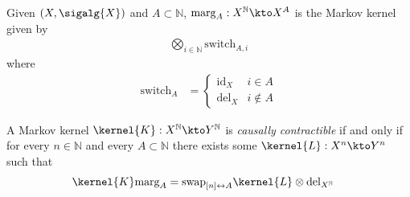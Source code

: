 \begin{definition}
Given $(X,\sigalg{X})$ and $A\subset\mathbb{N}$, $\mathrm{marg}_A:X^\mathbb{N}\kto X^A$ is the Markov kernel given by
\begin{align}
    \bigotimes_{i\in \mathbb{N}} \text{switch}_{A,i}
\end{align}
where
\begin{align}
    \text{switch}_A &= \begin{cases}
                        \text{id}_X&i\in A\\
                        \text{del}_X&i\not\in A
                        \end{cases}
\end{align} 
\end{definition}

\begin{theorem}\label{th:equal_of_condits}
A Markov kernel $\kernel{K}:X^{\mathbb{N}}\kto Y^{\mathbb{N}}$ is \emph{causally contractible} if and only if for every $n\in \mathbb{N}$ and every $A\subset\mathbb{N}$ there exists some $\kernel{L}:X^n\kto Y^n$ such that
\begin{align}
    \kernel{K} \text{marg}_A &= \text{swap}_{[n]\leftrightarrow A} \kernel{L}\otimes \text{del}_{X^{\mathbb{N}}}
\end{align}
\end{theorem}

